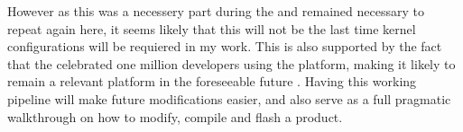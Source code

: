 However as this was a necessery part during the \preproject and remained necessary to repeat again here, it seems likely that this will not be the last time kernel configurations will be requiered in my work.
This is also supported by the fact that the \nvidia celebrated one million developers using the \nvidia \jetson platform, making it likely to remain a relevant platform in the foreseeable future \cite{blackNVIDIACelebratesMillion2023}.
Having this working pipeline will make future modifications easier, and also serve as a full pragmatic walkthrough  on how to modify, compile and flash a \jetson product.


